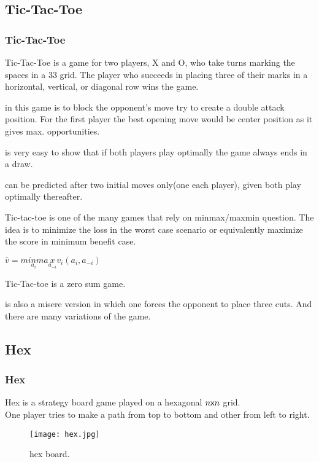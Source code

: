 \documentclass[12pt]{beamer}
\begin{document}
\subsection{Tic-Tac-Toe}
\begin{frame}

\frametitle{Tic-Tac-Toe}

Tic-Tac-Toe is a game for two players, X and O, who take turns marking the spaces in a 33 grid. The player who succeeds in placing three of their marks in a horizontal, vertical, or diagonal row wins the game.
\pause
\begin{block}
in this game is to block the opponent's move try to create a double attack position. For the first player the best opening move would be center position as it gives max. opportunities.
\end{block}
\pause
\begin{block}
is very easy to show that if both players play optimally the game always ends in a draw.
\end{block}
\pause
\begin{block}
can be predicted after two initial moves only(one each player), given both play optimally thereafter.
\end{block}

\end{frame}

\begin{frame}
Tic-tac-toe is one of the many games that rely on minmax/maxmin question.
The idea is to minimize the loss in the worst case scenario or equivalently maximize the score in minimum benefit case.
\begin{definition}
$\bar{v} = min \limits_{a_i} max \limits_{a_{-i}}v_i(a_i, a_{-i})$
\end{definition}
\pause
Tic-Tac-toe is a zero sum game.
\pause
\begin{block}
is also a misere version in which one forces the opponent to place three cuts. And there are many variations of the game.
\end{block}

\end{frame}

\subsection{Hex}

\begin{frame}

\frametitle{Hex}
Hex is a strategy board game played on a hexagonal $n \text{\sffamily x} n$ grid.\\
One player tries to make a path from top to bottom and other from left to right.
\begin{figure}
  \texttt{[image: hex.jpg]}
  \caption{hex board.}
  \label{fig:hex}
\end{figure}

\end{frame}
\end{document}
